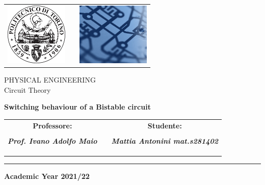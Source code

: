 \thispagestyle{empty}

\begin{center}
	\begin{tabularx}{\textwidth}{cXc}
	\multirow{2}{2.7cm}{\centering \includegraphics[height=3cm]{"Frontespizio/logo-poli"}} & \centering {\bfseries \large Politecnico di Torino} & \multirow{2}{3.4cm}{\centering \includegraphics[height=3cm]{"Frontespizio/det"}} \\[5mm]
	& \centering {\scshape \large Department of Electronics and Telecommunications} & \\
	\end{tabularx} 
\end{center}

\vspace{5mm}

\begin{center}
	{\large PHYSICAL ENGINEERING}\\
	{\Large Circuit Theory}\\

\end{center}



\begin{center}
	\begin{spacing}{2}
		{\bfseries \huge Switching behaviour of a Bistable circuit}
		
	\end{spacing}
\end{center}


\begin{center}
	\begin{tabularx}{\textwidth}{cXc}
	{\bfseries \large Professore:}	&&	{\bfseries \large Studente:}		\\
		&&		\\
	{\bfseries \large \itshape  Prof. Ivano Adolfo Maio}  &&	{\bfseries \large \itshape  Mattia Antonini mat.s281402}	\\
	&&		\\
    &&		\\	
    &&		\\

\end{tabularx}
\end{center}


\hrule
\begin{center}
	{\bfseries\Large Academic Year 2021/22}
\end{center}